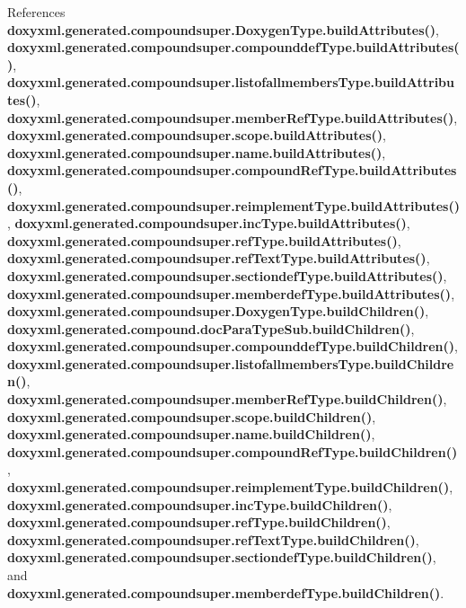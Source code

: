 References {\bf doxyxml.\+generated.\+compoundsuper.\+Doxygen\+Type.\+build\+Attributes()}, {\bf doxyxml.\+generated.\+compoundsuper.\+compounddef\+Type.\+build\+Attributes()}, {\bf doxyxml.\+generated.\+compoundsuper.\+listofallmembers\+Type.\+build\+Attributes()}, {\bf doxyxml.\+generated.\+compoundsuper.\+member\+Ref\+Type.\+build\+Attributes()}, {\bf doxyxml.\+generated.\+compoundsuper.\+scope.\+build\+Attributes()}, {\bf doxyxml.\+generated.\+compoundsuper.\+name.\+build\+Attributes()}, {\bf doxyxml.\+generated.\+compoundsuper.\+compound\+Ref\+Type.\+build\+Attributes()}, {\bf doxyxml.\+generated.\+compoundsuper.\+reimplement\+Type.\+build\+Attributes()}, {\bf doxyxml.\+generated.\+compoundsuper.\+inc\+Type.\+build\+Attributes()}, {\bf doxyxml.\+generated.\+compoundsuper.\+ref\+Type.\+build\+Attributes()}, {\bf doxyxml.\+generated.\+compoundsuper.\+ref\+Text\+Type.\+build\+Attributes()}, {\bf doxyxml.\+generated.\+compoundsuper.\+sectiondef\+Type.\+build\+Attributes()}, {\bf doxyxml.\+generated.\+compoundsuper.\+memberdef\+Type.\+build\+Attributes()}, {\bf doxyxml.\+generated.\+compoundsuper.\+Doxygen\+Type.\+build\+Children()}, {\bf doxyxml.\+generated.\+compound.\+doc\+Para\+Type\+Sub.\+build\+Children()}, {\bf doxyxml.\+generated.\+compoundsuper.\+compounddef\+Type.\+build\+Children()}, {\bf doxyxml.\+generated.\+compoundsuper.\+listofallmembers\+Type.\+build\+Children()}, {\bf doxyxml.\+generated.\+compoundsuper.\+member\+Ref\+Type.\+build\+Children()}, {\bf doxyxml.\+generated.\+compoundsuper.\+scope.\+build\+Children()}, {\bf doxyxml.\+generated.\+compoundsuper.\+name.\+build\+Children()}, {\bf doxyxml.\+generated.\+compoundsuper.\+compound\+Ref\+Type.\+build\+Children()}, {\bf doxyxml.\+generated.\+compoundsuper.\+reimplement\+Type.\+build\+Children()}, {\bf doxyxml.\+generated.\+compoundsuper.\+inc\+Type.\+build\+Children()}, {\bf doxyxml.\+generated.\+compoundsuper.\+ref\+Type.\+build\+Children()}, {\bf doxyxml.\+generated.\+compoundsuper.\+ref\+Text\+Type.\+build\+Children()}, {\bf doxyxml.\+generated.\+compoundsuper.\+sectiondef\+Type.\+build\+Children()}, and {\bf doxyxml.\+generated.\+compoundsuper.\+memberdef\+Type.\+build\+Children()}.



